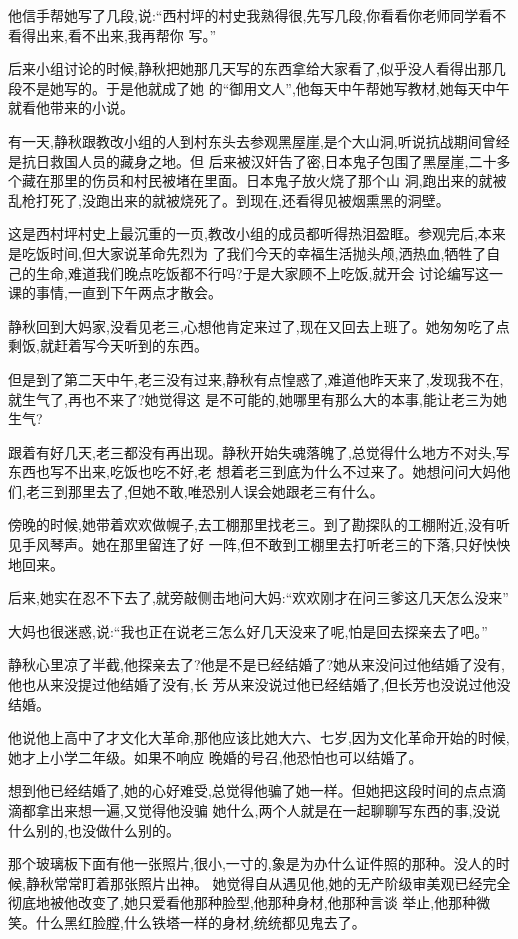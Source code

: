 ﻿\documentclass[12pt]{article}
\begin{document}
他信手帮她写了几段,说:``西村坪的村史我熟得很,先写几段,你看看你老师同学看不看得出来,看不出来,我再帮你
写。''

后来小组讨论的时候,静秋把她那几天写的东西拿给大家看了,似乎没人看得出那几段不是她写的。于是他就成了她
的``御用文人'',他每天中午帮她写教材,她每天中午就看他带来的小说。

有一天,静秋跟教改小组的人到村东头去参观黑屋崖,是个大山洞,听说抗战期间曾经是抗日救国人员的藏身之地。但
后来被汉奸告了密,日本鬼子包围了黑屋崖,二十多个藏在那里的伤员和村民被堵在里面。日本鬼子放火烧了那个山
洞,跑出来的就被乱枪打死了,没跑出来的就被烧死了。到现在,还看得见被烟熏黑的洞壁。

这是西村坪村史上最沉重的一页,教改小组的成员都听得热泪盈眶。参观完后,本来是吃饭时间,但大家说革命先烈为
了我们今天的幸福生活抛头颅,洒热血,牺牲了自己的生命,难道我们晚点吃饭都不行吗?于是大家顾不上吃饭,就开会
讨论编写这一课的事情,一直到下午两点才散会。

静秋回到大妈家,没看见老三,心想他肯定来过了,现在又回去上班了。她匆匆吃了点剩饭,就赶着写今天听到的东西。

但是到了第二天中午,老三没有过来,静秋有点惶惑了,难道他昨天来了,发现我不在,就生气了,再也不来了?她觉得这
是不可能的,她哪里有那么大的本事,能让老三为她生气?

跟着有好几天,老三都没有再出现。静秋开始失魂落魄了,总觉得什么地方不对头,写东西也写不出来,吃饭也吃不好,老
想着老三到底为什么不过来了。她想问问大妈他们,老三到那里去了,但她不敢,唯恐别人误会她跟老三有什么。

傍晚的时候,她带着欢欢做幌子,去工棚那里找老三。到了勘探队的工棚附近,没有听见手风琴声。她在那里留连了好
一阵,但不敢到工棚里去打听老三的下落,只好怏怏地回来。

后来,她实在忍不下去了,就旁敲侧击地问大妈:``欢欢刚才在问三爹这几天怎么没来\myrule ''

大妈也很迷惑,说:``我也正在说老三怎么好几天没来了呢,怕是回去探亲去了吧。''

静秋心里凉了半截,他探亲去了?他是不是已经结婚了?她从来没问过他结婚了没有,他也从来没提过他结婚了没有,长
芳从来没说过他已经结婚了,但长芳也没说过他没结婚。

他说他上高中了才文化大革命,那他应该比她大六、七岁,因为文化革命开始的时候,她才上小学二年级。如果不响应
晚婚的号召,他恐怕也可以结婚了。

想到他已经结婚了,她的心好难受,总觉得他骗了她一样。但她把这段时间的点点滴滴都拿出来想一遍,又觉得他没骗
她什么,两个人就是在一起聊聊写东西的事,没说什么别的,也没做什么别的。

那个玻璃板下面有他一张照片,很小,一寸的,象是为办什么证件照的那种。没人的时候,静秋常常盯着那张照片出神。
她觉得自从遇见他,她的无产阶级审美观已经完全彻底地被他改变了,她只爱看他那种脸型,他那种身材,他那种言谈
举止,他那种微笑。什么黑红脸膛,什么铁塔一样的身材,统统都见鬼去了。
\end{document}
